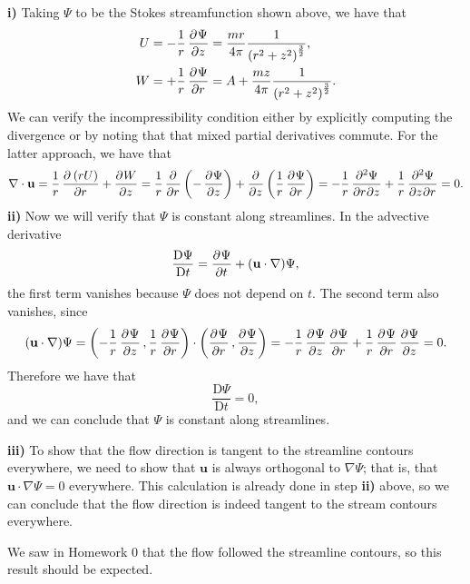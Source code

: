 \documentclass{article}
\def\*#1{\mathbf{#1}}
\newcommand{\dadvd}[2]{\dfrac{\text{D} #1}{\text{D} #2}} %
\begin{document}
\textbf{i)} Taking $\Psi$ to be the Stokes streamfunction shown above,
we have that
%
\begin{align*}
    U &= - \frac{1}{r} \dpd{\Psi}{z}
        = \frac{m r}{4 \pi} \frac{1}{\del{r^2 + z^2}^{\frac{3}{2}}}
        , \\
    W &= + \frac{1}{r} \dpd{\Psi}{r}
        = A + \frac{m z}{4 \pi} \frac{1}{\del{r^2 + z^2}^{\frac{3}{2}}}
        .
\end{align*}
%
We can verify the incompressibility condition either by explicitly
computing the divergence or by noting that that mixed partial
derivatives commute. For the latter approach, we have that
%
\begin{equation*}
    \nabla \cdot \*u
        = \frac{1}{r} \dpd{\del{r U}}{r} + \dpd{W}{z}
        = \frac{1}{r} \dpd{}{r} \del{- \dpd{\Psi}{z}}
            + \dpd{}{z} \del{\frac{1}{r} \dpd{\Psi}{r}}
        = - \frac{1}{r} \dmd{\Psi}{2}{r}{}{z}{}
            + \frac{1}{r} \dmd{\Psi}{2}{z}{}{r}{}
        = 0
        .
\end{equation*}
%
\textbf{ii)} Now we will verify that $\Psi$ is constant along
streamlines. In the advective derivative
%
\begin{equation*}
    \dadvd{\Psi}{t} = \dpd{\Psi}{t} + (\*u \cdot \nabla) \Psi
    ,
\end{equation*}
%
the first term vanishes because $\Psi$ does not depend on $t$. The
second term also vanishes, since
%
\begin{equation*}
    (\*u \cdot \nabla) \Psi
        = \del{- \frac{1}{r} \dpd{\Psi}{z}, \frac{1}{r} \dpd{\Psi}{r}}
            \cdot \del{\dpd{\Psi}{r}, \dpd{\Psi}{z}}
        = - \frac{1}{r} \dpd{\Psi}{z} \dpd{\Psi}{r}
            +\frac{1}{r} \dpd{\Psi}{r} \dpd{\Psi}{z}
        = 0
        .
\end{equation*}
%
Therefore we have that
%
\begin{equation*}
    \dadvd{\Psi}{t} = 0
    ,
\end{equation*}
%
and we can conclude that $\Psi$ is constant along streamlines.

\textbf{iii)} To show that the flow direction is tangent to the
streamline contours everywhere, we need to show that $\*u$ is always
orthogonal to $\nabla \Psi$; that is, that $\*u \cdot \nabla \Psi = 0$
everywhere. This calculation is already done in step \textbf{ii)} above,
so we can conclude that the flow direction is indeed tangent to the
stream contours everywhere.

We saw in Homework 0 that the flow followed the streamline contours, so
this result should be expected.
\end{document}
